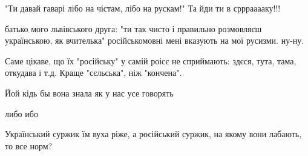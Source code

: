 \begin{itemize}
{%
 
"Ти давай гаварі лібо на чістам, лібо на рускам!"
Та йди ти в срррааааку!!!

 
батько мого львівського друга: "ти так чисто і правильно розмовляєш українською, як вчителька"
російськомовні мені вказують на мої русизми. ну-ну.

 
Саме цікаве, що їх "російську" у самій роісє не сприймають: здєся, тута, тама, откудава і т.д. Краще "сєльська", ніж "кончена".

 
Йой кідь бы вона знала як у нас усе говорять

 
либо ибо

 
Український суржик їм вуха ріже, а російський суржик, на якому вони лабають, то все норм?

\begin{itemize}{
 
}
\end{itemize}}
\end{itemize}

